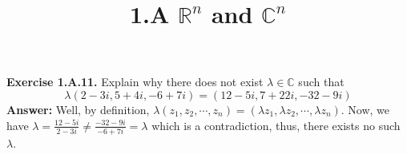 \documentclass{article}
\title{\textbf{1.A $\mathbb{R}^n$ and $\mathbb{C}^n$}}
\begin{document}
	\maketitle
	\textbf{Exercise 1.A.11.} Explain why there does not exist $\lambda \in \mathbb{C}$ such that
	$$\lambda(2 - 3i, 5 + 4i, -6 + 7i) = (12 - 5i, 7 + 22i, -32 - 9i)$$
	\textbf{Answer:} Well, by definition, $\lambda(z_1, z_2, \cdots, z_n) = (\lambda z_1, \lambda z_2, \cdots, \lambda z_n)$. Now, we have $\lambda = \frac{12 - 5i}{2 - 3i} \neq \frac{-32 - 9i}{-6 + 7i} = \lambda$ which is a contradiction, thus, there exists no such $\lambda$. 
\end{document}
